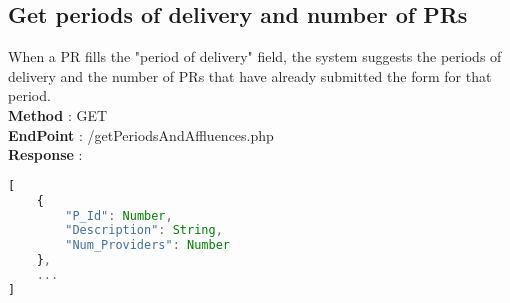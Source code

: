 \subsection{Get periods of delivery and number of PRs}
When a PR fills the "period of delivery" field, the system suggests the periods of delivery and the number of PRs that have already submitted the form for that period.\\
\textbf{Method} : GET \\
\textbf{EndPoint} : /getPeriodsAndAffluences.php \\
\textbf{Response} :
\begin{lstlisting}[language=JavaScript, label={lst:jscode}, basicstyle=\ttfamily]
[
    {
        "P_Id": Number,
        "Description": String,
        "Num_Providers": Number
    },
    ...
]
\end{lstlisting}
